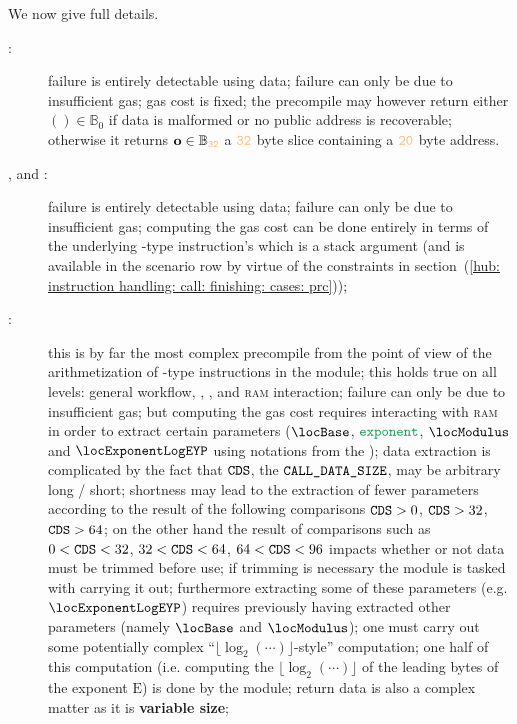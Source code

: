\noindent We now give full details. 
\begin{description}
	\item[\instEcrecover{}:]
		failure is entirely detectable using \hubMod{} data; 
		failure can only be due to insufficient gas;
		gas cost is fixed;
		the precompile may however return either $() \in \mathbb{B}_{0}$ if data is malformed or no public address is recoverable;
		otherwise it returns $\textbf{o} \in \mathbb{B}_{\evmWordSize}$ a $\evmWordSize$ byte slice containing a $\addressSize$ byte address. 
	\item[\instShaTwo{}, \instRipemd{} and \instIdentity{}:]
		failure is entirely detectable using \hubMod{} data; 
		failure can only be due to insufficient gas;
		computing the gas cost can be done entirely in terms of the underlying -type instruction's \CDS{} which is a stack argument (and is available in the scenario row by virtue of the constraints in section~(\ref{hub: instruction handling: call: finishing: cases: prc}));
	\item[\instModexp{}:]
		this is by far the most complex precompile from the point of view of the arithmetization of -type instructions in the \hubMod{} module;
		this holds true on all levels: \hubMod{} general workflow, \oobMod{}, \expMod{}, \mmuMod{} and \textsc{ram} interaction;
		failure can only be due to insufficient gas;
		but computing the gas cost requires interacting with \textsc{ram} in order to extract certain parameters
		($\locBase$, $\locExponent$, $\locModulus$ and $\locExponentLogEYP$ using notations from the \cite{EYP-London});
		data extraction is complicated by the fact that $\texttt{CDS}$, the $\texttt{CALL\_DATA\_SIZE}$, may be arbitrary long / short;
		shortness may lead to the extraction of fewer parameters according to the result of the following comparisons $\texttt{CDS} > 0 $, $\texttt{CDS} > 32$, $\texttt{CDS} > 64$;
		on the other hand the result of comparisons such as $0 < \texttt{CDS} < 32$, $32 <\texttt{CDS} < 64$, $64 < \texttt{CDS} < 96$ impacts whether or not data must be trimmed before use;
		if trimming is necessary the \expMod{} module is tasked with carrying it out;
		furthermore extracting some of these parameters (e.g. $\locExponentLogEYP$) requires previously having extracted other parameters (namely $\locBase$ and $\locModulus$);
		one must carry out some potentially complex ``$\lfloor \log_2(\cdots) \rfloor$-style'' computation;
		one half of this computation (i.e. computing the $\lfloor \log_2(\cdots) \rfloor$ of the leading bytes of the exponent $\text{E}$) is done by the \expMod{} module;
		return data is also a complex matter as it is \textbf{variable size};

\end{description}
